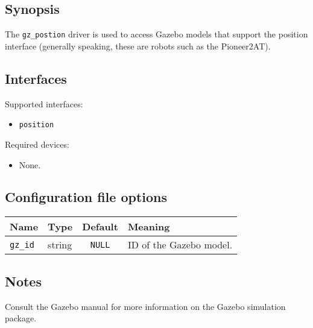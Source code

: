 \subsection*{Synopsis}

The {\tt gz\_postion} driver is used to access Gazebo models that
support the position interface (generally speaking, these are robots
such as the Pioneer2AT).  

\subsection*{Interfaces}

\noindent Supported interfaces:
\begin{itemize}
\item {\tt position}
\end{itemize}

\noindent Required devices:
\begin{itemize}
\item None.
\end{itemize}



\subsection*{Configuration file options}

\begin{center}
{\small \begin{tabularx}{\columnwidth}{|l|l|c|X|}
\hline
Name & Type & Default & Meaning\\
\hline
{\tt gz\_id} & string & {\tt NULL} & ID of the Gazebo model. \\
\hline
\end{tabularx}}
\end{center}

\subsection*{Notes}

Consult the Gazebo manual for more information on the Gazebo
simulation package.

